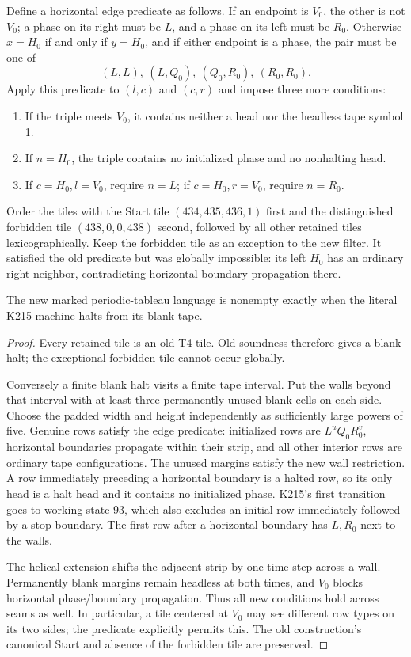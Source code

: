 Define a horizontal edge predicate as follows.  If an endpoint is
$V_0$, the other is not $V_0$; a phase on its right must be $L$, and
a phase on its left must be $R_0$.  Otherwise $x=H_0$ if and only if
$y=H_0$, and if either endpoint is a phase, the pair must be one of
\[
(L,L),\ (L,Q_0),\ (Q_0,R_0),\ (R_0,R_0).
\]
Apply this predicate to $(l,c)$ and $(c,r)$ and impose three more
conditions:
\begin{enumerate}
\item If the triple meets $V_0$, it contains neither a head nor the
      headless tape symbol 1.
\item If $n=H_0$, the triple contains no initialized phase and no
      nonhalting head.
\item If $c=H_0,l=V_0$, require $n=L$; if $c=H_0,r=V_0$,
      require $n=R_0$.
\end{enumerate}
Order the tiles with the Start tile $(434,435,436,1)$ first and the
distinguished forbidden tile $(438,0,0,438)$ second, followed by all
other retained tiles lexicographically.  Keep the forbidden tile as
an exception to the new filter.  It satisfied the old predicate but
was globally impossible: its left $H_0$ has an ordinary right neighbor,
contradicting horizontal boundary propagation there.

\begin{proposition}
The new marked periodic-tableau language is nonempty exactly when
the literal K215 machine halts from its blank tape.
\end{proposition}
\begin{proof}
Every retained tile is an old T4 tile.  Old soundness therefore gives
a blank halt; the exceptional forbidden tile cannot occur globally.

Conversely a finite blank halt visits a finite tape interval.  Put the
walls beyond that interval with at least three permanently unused blank
cells on each side.  Choose the padded width and height independently
as sufficiently large powers of five.  Genuine rows satisfy the edge
predicate: initialized rows are $L^uQ_0R_0^v$, horizontal boundaries
propagate within their strip, and all other interior rows are ordinary
tape configurations.  The unused margins satisfy the new wall
restriction.  A row immediately preceding a horizontal boundary is a
halted row, so its only head is a halt head and it contains no initialized
phase.  K215's first transition goes to working state 93, which also
excludes an initial row immediately followed by a stop boundary.
The first row after a horizontal boundary has $L,R_0$ next to the walls.

The helical extension shifts the adjacent strip by one time step across
a wall.  Permanently blank margins remain headless at both times, and
$V_0$ blocks horizontal phase/boundary propagation.  Thus all new
conditions hold across seams as well.  In particular, a tile centered
at $V_0$ may see different row types on its two sides; the predicate
explicitly permits this.  The old construction's canonical Start and
absence of the forbidden tile are preserved.
\end{proof}

